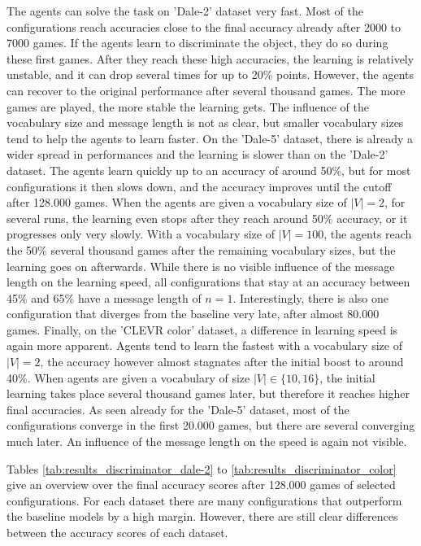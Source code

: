 The agents can solve the task on 'Dale-2' dataset very fast.
Most of the configurations reach accuracies close to the final accuracy already after 2000 to 7000 games.
If the agents learn to discriminate the object, they do so during these first games.
After they reach these high accuracies, the learning is relatively unstable, and it can drop several times for up to 20\% points.
However, the agents can recover to the original performance after several thousand games.
The more games are played, the more stable the learning gets.
The influence of the vocabulary size and message length is not as clear, but smaller vocabulary sizes tend to help the agents to learn faster.
On the 'Dale-5' dataset, there is already a wider spread in performances and the learning is slower than on the 'Dale-2' dataset.
The agents learn quickly up to an accuracy of around 50\%, but for most configurations it then slows down, and the accuracy improves until the cutoff after 128.000 games.
When the agents are given a vocabulary size of $|V|=2$, for several runs, the learning even stops after they reach around 50\% accuracy, or it progresses only very slowly.
With a vocabulary size of $|V|=100$, the agents reach the 50\% several thousand games after the remaining vocabulary sizes, but the learning goes on afterwards.
While there is no visible influence of the message length on the learning speed, all configurations that stay at an accuracy between 45\% and 65\% have a message length of $n=1$.
Interestingly, there is also one configuration that diverges from the baseline very late, after almost 80.000 games.
Finally, on the 'CLEVR color' dataset, a difference in learning speed is again more apparent.
Agents tend to learn the fastest with a vocabulary size of $|V|=2$, the accuracy however almost stagnates after the initial boost to around 40\%.
When agents are given a vocabulary of size $|V| \in \{10,16\}$, the initial learning takes place several thousand games later, but therefore it reaches higher final accuracies.
As seen already for the 'Dale-5' dataset, most of the configurations converge in the first 20.000 games, but there are several converging much later.
An influence of the message length on the speed is again not visible.

Tables \ref{tab:results_discriminator_dale-2} to \ref{tab:results_discriminator_color} give an overview over the final accuracy scores after 128.000 games of selected configurations.
For each dataset there are many configurations that outperform the baseline models by a high margin.
However, there are still clear differences between the accuracy scores of each dataset.

